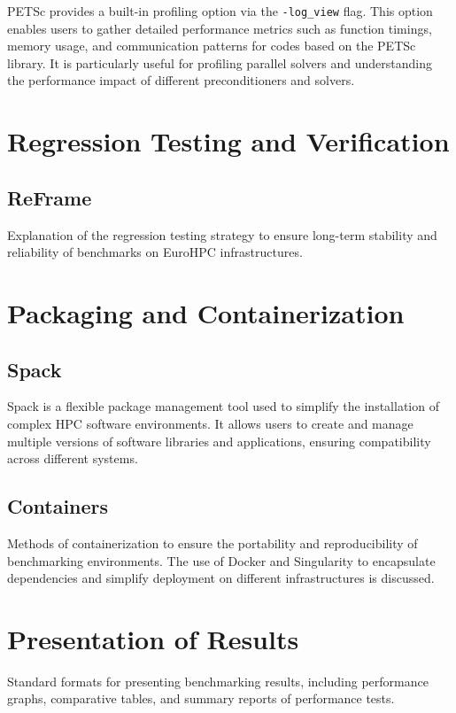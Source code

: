 PETSc provides a built-in profiling option via the \texttt{-log\_view} flag. 
This option enables users to gather detailed performance metrics such as function timings, memory usage, and communication patterns for codes based on the PETSc library. 
It is particularly useful for profiling parallel solvers and understanding the performance impact of different preconditioners and solvers.



\section{Regression Testing and Verification}
\label{sec:methodology-regression}

\subsection{ReFrame}
\label{sec:methodology-regression-reframe}

Explanation of the regression testing strategy to ensure long-term stability and reliability of benchmarks on EuroHPC infrastructures.

\section{Packaging and Containerization}
\label{sec:methodology-packaging}

\subsection{Spack}
\label{sec:methodology-packaging-spack}

Spack is a flexible package management tool used to simplify the installation of complex HPC software environments. It allows users to create and manage multiple versions of software libraries and applications, ensuring compatibility across different systems.

\subsection{Containers}
\label{sec:methodology-packaging-container}

Methods of containerization to ensure the portability and reproducibility of benchmarking environments.
The use of Docker and Singularity to encapsulate dependencies and simplify deployment on different infrastructures is discussed.

\section{Presentation of Results}
\label{sec:methodology-presentation}
Standard formats for presenting benchmarking results, including performance graphs, comparative tables, and summary reports of performance tests.


